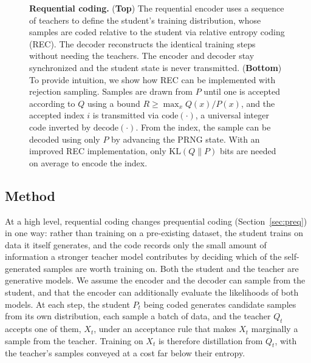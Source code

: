 \documentclass{article}
\theoremstyle{plain}
\theoremstyle{definition}
\theoremstyle{remark}
\begin{document}
\begin{figure}[t]
\vspace{1.5mm}
\caption{\small\textbf{Requential coding.} (\textbf{Top})
The requential encoder uses a sequence of teachers to define the student's training distribution, whose samples are coded relative to the student via relative entropy coding (REC). The decoder reconstructs the identical training steps without needing the teachers. The encoder and decoder stay synchronized and the student state is never transmitted.
 (\textbf{Bottom}) To provide intuition, we show how REC can be implemented with rejection sampling. Samples are drawn from $P$ until one is accepted according to $Q$ using a bound $R \geq \max_x Q(x)/P(x)$, and the accepted index $i$ is transmitted via $\mathrm{code}(\cdot)$, a universal integer code inverted by $\mathrm{decode}(\cdot)$. From the index, the sample can be decoded using only $P$ by advancing the PRNG state. With an improved REC implementation, only $\mathrm{KL}(Q\|P)$ bits are needed on average to encode the index.
}
\label{alg:requential-algs}
\end{figure}


\subsection{Method}\label{sec:req_construction}
At a high level, requential coding changes prequential coding (Section~\ref{sec:preq}) in one way: rather than training on a pre-existing dataset, the student trains on data it itself generates, and the code records only the small amount of information a stronger teacher model contributes by deciding which of the self-generated samples are worth training on. Both the student and the teacher are generative models. We assume the encoder and the decoder can sample from the student, and that the encoder can additionally evaluate the likelihoods of both models. At each step, the student $P_t$ being coded generates candidate samples from its own distribution, each sample a batch of data, and the teacher $Q_t$ accepts one of them, $X_t$, under an acceptance rule that makes $X_t$ marginally a sample from the teacher. Training on $X_t$ is therefore distillation from $Q_t$, with the teacher's samples conveyed at a cost far below their entropy.
\end{document}
